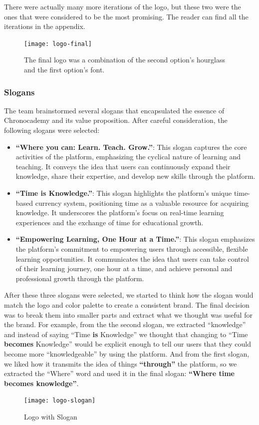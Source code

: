 \noindent There were actually many more iterations of the logo, but these two were the ones that were considered to be the most promising.
The reader can find all the iterations in the appendix.
\clearpage

\begin{figure}[t]
    \centering
    \texttt{[image: logo-final]}
    \caption{The final logo was a combination of the second option's hourglass and the first option's font.}
    \label{fig:figure6}
\end{figure}

\subsubsection{Slogans}\label{subsubsec:slogans}
The team brainstormed several slogans that encapsulated the essence of Chronocademy and its value proposition.
After careful consideration, the following slogans were selected:
\begin{itemize}
    \item \textbf{``Where you can: Learn. Teach. Grow.''}: This slogan captures the core activities of the platform, emphasizing the cyclical nature of learning and teaching.
    It conveys the idea that users can continuously expand their knowledge, share their expertise, and develop new skills through the platform.
    \item \textbf{``Time is Knowledge.''}: This slogan highlights the platform’s unique time-based currency system, positioning time as a valuable resource for acquiring knowledge.
    It underscores the platform’s focus on real-time learning experiences and the exchange of time for educational growth.
    \item \textbf{``Empowering Learning, One Hour at a Time.''}: This slogan emphasizes the platform’s commitment to empowering users through accessible, flexible learning opportunities.
    It communicates the idea that users can take control of their learning journey, one hour at a time, and achieve personal and professional growth through the platform.

\end{itemize}

After these three slogans were selected, we started to think how the slogan would match the logo and color palette to create a consistent brand.
The final decision was to break them into smaller parts and extract what we thought was useful for the brand.
For example, from the the second slogan, we extracted ``knowledge'' and instead of saying ``Time \textbf{is} Knowledge'' we thought that changing to ``Time \textbf{becomes} Knowledge'' would be explicit enough to tell our users that they could become more ``knowledgeable'' by using the platform.
And from the first slogan, we liked how it transmits the idea of things \textbf{``through''} the platform, so we extracted the ``Where'' word and used it in the final slogan: \textbf{``Where time becomes knowledge''}.
\begin{figure}[h]
    \centering
    \texttt{[image: logo-slogan]}
    \caption{Logo with Slogan}
    \label{fig:figure7}
\end{figure}

